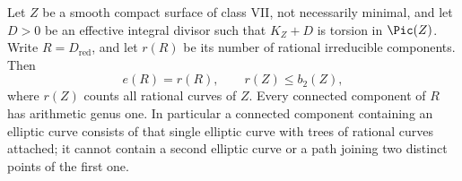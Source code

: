 \begin{proposition}\label{cdp:st:C.2.VII.1}



Let $Z$ be a smooth compact surface of class VII, not
necessarily minimal, and let $D>0$ be an effective integral
divisor such that $K_Z+D$ is torsion in $\Pic(Z)$.
Write $R=D_{\mathrm{red}}$, and let $r(R)$ be its number
of rational irreducible components. Then
\[
 e(R)=r(R),\qquad r(Z)\le b_2(Z),
\tag{C.VII.1}\label{cdp:eq:C.VII.1}
\]
where $r(Z)$ counts all rational curves of $Z$.
Every connected component of $R$ has arithmetic genus one.
In particular a connected component containing an elliptic
curve consists of that single elliptic curve with trees of
rational curves attached; it cannot contain a second
elliptic curve or a path joining two distinct points of the
first one.
\end{proposition}
